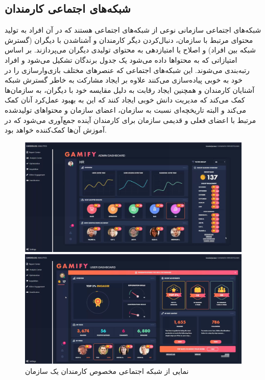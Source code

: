 \subsection{شبکه‌های اجتماعی کارمندان}
\label{sec:socialnetwork}
شبکه‌های اجتماعی سازمانی نوعی از شبکه‌های اجتماعی هستند که در آن افراد به تولید محتوای مرتبط با سازمان، دنبال‌کردن دیگر کارمندان و آشناشدن با دیگران (گسترش شبکه بین افراد) و اصلاح یا امتیازدهی به محتوای تولیدی دیگران می‌پردازند. بر اساس امتیازاتی که به محتواها داده می‌شود یک جدول برندگان تشکیل می‌شود و افراد رتبه‌بندی می‌شوند.
این شبکه‌های اجتماعی که عنصرهای مختلف بازی‌وارسازی را در خود به خوبی پیاده‌سازی می‌کنند علاوه بر ایجاد مشارکت به خاطر گسترش شبکه آشنایان کارمندان و همچنین ایجاد رقابت به دلیل مقایسه خود با دیگران، به سازمان‌ها کمک می‌کند که مدیریت دانش خوبی ایجاد کنند که این به بهبود عمل‌کرد آنان کمک می‌کند و البته تاریخچه‌ای نسبت به سازمان، اعضای سازمان و محتواهای تولیدشده مرتبط با اعضای فعلی و قدیمی سازمان برای کارمندان آینده جمع‌آوری می‌شود که در آموزش آن‌ها کمک‌کننده خواهد بود.

\begin{figure}[!htb]
	\centering
	\begin{minipage}[b]{0.49\textwidth}
		\includegraphics[width=\textwidth]{Figures/social1.png}
	\end{minipage}
	\begin{minipage}[b]{0.49\textwidth}
		\includegraphics[width=\textwidth]{Figures/social2.png}
	\end{minipage}
	\caption{نمایی از شبکه اجتماعی مخصوص کارمندان یک سازمان}
\end{figure}

